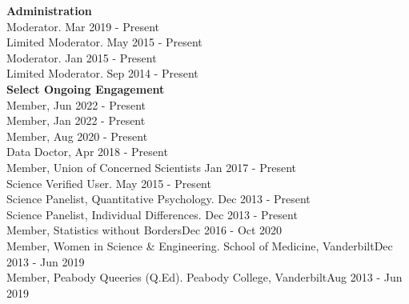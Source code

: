 {\large \textbf{Administration}}\\
Moderator. \hfill{Mar 2019 - Present}\smallskip\\
Limited Moderator. \hfill{May 2015 - Present}\smallskip\\
Moderator. \hfill{Jan 2015 - Present}\smallskip\\
Limited Moderator. \hfill{Sep 2014 - Present}\medskip\\
%
%
{\large \textbf{Select Ongoing Engagement}}\smallskip\\
%
Member,  \hfill{Jun 2022 - Present}\smallskip\\
Member,  \hfill{Jan 2022 - Present}\smallskip\\
Member,  \hfill{Aug 2020 - Present}\smallskip\\
Data Doctor,  \hfill{Apr 2018 - Present}\smallskip\\
Member, Union of Concerned Scientists \hfill{Jan 2017 - Present}\smallskip\\
Science Verified User. \hfill{May 2015 - Present}\smallskip\\
Science Panelist, Quantitative Psychology. \hfill{Dec 2013 - Present}\smallskip\\%
Science Panelist, Individual Differences. \hfill{Dec 2013 - Present}\smallskip\\
Member, Statistics without Borders\hfill{Dec 2016 - Oct 2020}\smallskip\\
Member, Women in Science \& Engineering. School of Medicine, Vanderbilt\hfill{Dec 2013 - Jun 2019}\smallskip\\
Member, Peabody Queeries (Q.Ed). Peabody College, Vanderbilt\hfill{Aug 2013 - Jun 2019}\medskip\\
